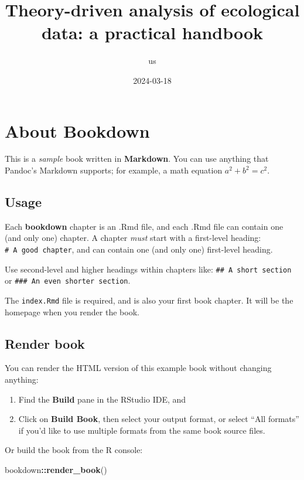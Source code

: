 \documentclass[
]{book}
\title{Theory-driven analysis of ecological data: a practical handbook}
\author{us}
\date{2024-03-18}
\newenvironment{Shaded}{\begin{snugshade}}{\end{snugshade}}
\newcommand{\FunctionTok}[1]{\textcolor[rgb]{0.13,0.29,0.53}{\textbf{#1}}}
\newcommand{\NormalTok}[1]{#1}
\newcommand{\SpecialCharTok}[1]{\textcolor[rgb]{0.81,0.36,0.00}{\textbf{#1}}}
\theoremstyle{definition}
\theoremstyle{definition}
\theoremstyle{definition}
\theoremstyle{definition}
\theoremstyle{remark}
\begin{document}
\maketitle

{
\setcounter{tocdepth}{1}
\tableofcontents
}
\chapter{About Bookdown}\label{about-bookdown}

This is a \emph{sample} book written in \textbf{Markdown}. You can use anything that Pandoc's Markdown supports; for example, a math equation \(a^2 + b^2 = c^2\).

\section{Usage}\label{usage}

Each \textbf{bookdown} chapter is an .Rmd file, and each .Rmd file can contain one (and only one) chapter. A chapter \emph{must} start with a first-level heading: \texttt{\#\ A\ good\ chapter}, and can contain one (and only one) first-level heading.

Use second-level and higher headings within chapters like: \texttt{\#\#\ A\ short\ section} or \texttt{\#\#\#\ An\ even\ shorter\ section}.

The \texttt{index.Rmd} file is required, and is also your first book chapter. It will be the homepage when you render the book.

\section{Render book}\label{render-book}

You can render the HTML version of this example book without changing anything:

\begin{enumerate}
\def\labelenumi{\arabic{enumi}.}
\item
  Find the \textbf{Build} pane in the RStudio IDE, and
\item
  Click on \textbf{Build Book}, then select your output format, or select ``All formats'' if you'd like to use multiple formats from the same book source files.
\end{enumerate}

Or build the book from the R console:

\begin{Shaded}
\begin{Highlighting}[]
\NormalTok{bookdown}\SpecialCharTok{::}\FunctionTok{render\_book}\NormalTok{()}
\end{Highlighting}
\end{Shaded}
\end{document}

